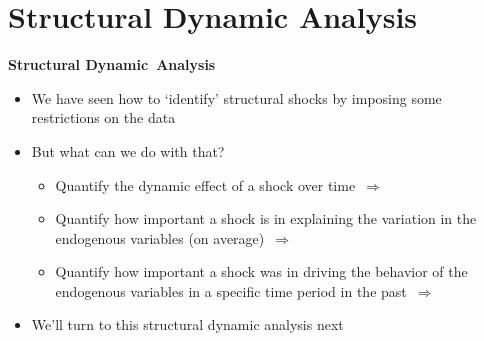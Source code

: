 
\section{Structural Dynamic Analysis}

\begin{frame}
\vspace{3cm}\color{title} 
\end{frame}


\begin{frame}
{\textbf{Structural Dynamic\ Analysis}}\bigskip

\begin{itemize}
\item We have seen how to `identify' structural shocks by imposing some
restrictions on the data\bigskip \medskip 

\item But what can we do with that?\medskip \pause

\begin{itemize}
\item Quantify the dynamic effect of a shock over time\ $\Rightarrow $\ {%
}\bigskip 

\item Quantify how important a shock is in explaining the variation in the
endogenous variables (on average)\ $\Rightarrow $\ {}%
\bigskip 

\item Quantify how important a shock was in driving the behavior of the
endogenous variables in a specific time period in the past\ $\Rightarrow $\ {%
}%
\bigskip \medskip 
\end{itemize}

\item We'll turn to this structural dynamic analysis next
\end{itemize}

\end{frame}

